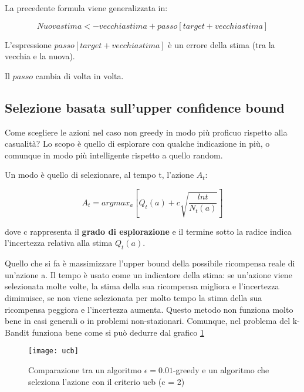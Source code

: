 La precedente formula viene generalizzata in:

\begin{equation}
 Nuova stima <- vecchia stima + passo[target + vecchia stima]
\end{equation}

L'espressione $passo[target + vecchia stima]$ è un errore della stima (tra la vecchia
e la nuova).

Il $passo$ cambia di volta in volta.


\subsection{Selezione basata sull'upper confidence bound}

Come scegliere le azioni nel caso non greedy in modo più proficuo
rispetto alla casualità? Lo scopo è quello di esplorare con qualche indicazione
in più, o comunque in modo più intelligente rispetto a quello random.

Un modo è quello di selezionare, al tempo t, l'azione $A_t$:

\begin{equation}
A_t = argmax_a [Q_t(a) + c \sqrt{\frac{ln t}{N_t(a)}}]
\end{equation}

dove c rappresenta il \textbf{grado di esplorazione} e il termine
sotto la radice indica l'incertezza relativa alla stima $Q_t(a)$.

Quello che si fa è massimizzare l'upper bound della possibile
ricompensa reale di un'azione a. Il tempo è usato come un
indicatore della stima: se un'azione viene selezionata molte volte,
la stima della sua ricompensa migliora e l'incertezza diminuisce,
se non viene selezionata per molto tempo la stima della sua
ricompensa peggiora e l'incertezza aumenta.
Questo metodo non funziona molto bene in casi generali o in problemi
non-stazionari. Comunque, nel problema del k-Bandit funziona bene
come si può dedurre dal grafico \ref{fig:ucb}

\begin{figure}[H]
\centering
\texttt{[image: ucb]}
\caption{Comparazione tra un algoritmo $\epsilon = 0.01$-greedy e un algoritmo
che seleziona l'azione con il criterio ucb (c = 2)}
\label{fig:ucb}
\end{figure}




